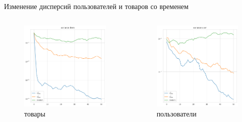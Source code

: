 \documentclass{beamer}
\begin{document}
\begin{frame}
    Изменение дисперсий пользователей и товаров со временем
    \begin{columns}[c]
        \begin{figure}
            \centering
            \includegraphics[width=1\textwidth]{images/new_photo/variance_item.png}
            \caption{товары}
        \end{figure}

        \begin{figure}
            \centering
            \includegraphics[width=1\textwidth]{images/new_photo/variance_user.png}
            \caption{пользователи}
        \end{figure}
    \end{columns}
    

\end{frame}
\end{document}
